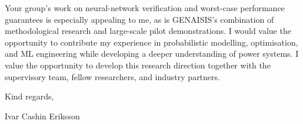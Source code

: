 \documentclass[11pt,a4paper]{moderncv}
\begin{document}
\vspace*{2em}
Your group's work on neural-network verification and worst-case performance guarantees is especially appealing to me, as is GENAISIS's combination of methodological research and large-scale pilot demonstrations. I would value the opportunity to contribute my experience in probabilistic modelling, optimisation, and ML engineering while developing a deeper understanding of power systems. I value the opportunity to develop this research direction together with the supervisory team, fellow researchers, and industry partners.

\vspace{2em}
Kind regards,

Ivar Cashin Eriksson
\end{document}

